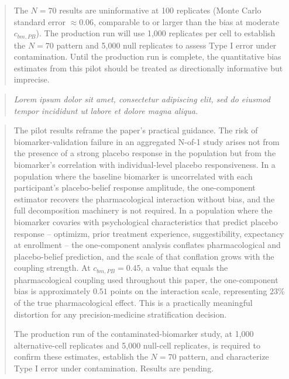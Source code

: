 \documentclass[
  11pt,
]{article}
\newenvironment{rgt}{%
  \begin{quote}\small\itshape\color[RGB]{20,60,160}}{%
  \end{quote}}
\newenvironment{orig}{%
  \begin{quote}\normalsize\color[gray]{0.55}}{%
  \end{quote}}
\begin{document}
\begin{orig}
The \(N=70\) results are uninformative at 100 replicates (Monte
Carlo standard error \(\approx 0.06\), comparable to or larger
than the bias at moderate \(c_{bm,PB}\)). The production run
will use 1,000 replicates per cell to establish the \(N=70\)
pattern and 5,000 null replicates to assess Type I error under
contamination. Until the production run is complete, the
quantitative bias estimates from this pilot should be treated
as directionally informative but imprecise.

\end{orig}

\begin{rgt}
Lorem ipsum dolor sit amet, consectetur adipiscing elit, sed do eiusmod tempor incididunt ut labore et dolore magna aliqua.

\end{rgt}

\begin{orig}
The pilot results reframe the paper's practical guidance. The
risk of biomarker-validation failure in an aggregated N-of-1
study arises not from the presence of a strong placebo response
in the population but from the biomarker's correlation with
individual-level placebo responsiveness. In a population where
the baseline biomarker is uncorrelated with each participant's
placebo-belief response amplitude, the one-component estimator
recovers the pharmacological interaction without bias, and the
full decomposition machinery is not required. In a population
where the biomarker covaries with psychological characteristics
that predict placebo response -- optimizm, prior treatment
experience, suggestibility, expectancy at enrollment -- the
one-component analysis conflates pharmacological and
placebo-belief prediction, and the scale of that conflation
grows with the coupling strength. At \(c_{bm,PB}=0.45\), a
value that equals the pharmacological coupling used throughout
this paper, the one-component bias is approximately \(0.51\)
points on the interaction scale, representing \(23\%\) of the
true pharmacological effect. This is a practically meaningful
distortion for any precision-medicine stratification decision.

The production run of the contaminated-biomarker study, at
1,000 alternative-cell replicates and 5,000 null-cell
replicates, is required to confirm these estimates, establish
the \(N=70\) pattern, and characterize Type I error under
contamination. Results are pending.

\end{orig}
\end{document}
